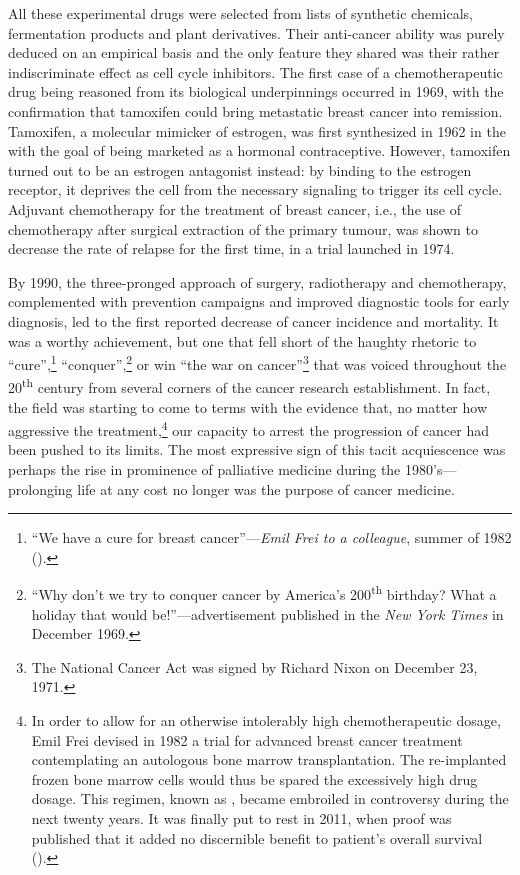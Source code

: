 All these experimental drugs were selected from lists of synthetic chemicals,
fermentation products and plant derivatives.  Their anti-cancer ability was
purely deduced on an empirical basis and the only feature they shared was their
rather indiscriminate effect as cell cycle inhibitors.  The first case of a
chemotherapeutic drug being reasoned from its biological underpinnings occurred
in 1969, with the confirmation that tamoxifen could bring metastatic breast
cancer into remission.\cite{cole_new_1971} Tamoxifen, a molecular mimicker of
estrogen, was first synthesized in 1962 in the  with the goal of
being marketed as a hormonal contraceptive.  However, tamoxifen turned out to be
an estrogen antagonist instead: by binding to the estrogen receptor, it deprives
the cell from the necessary signaling to trigger its cell
cycle.\cite{jordan_effects_1977} Adjuvant chemotherapy for the treatment of
breast cancer, i.e., the use of chemotherapy after surgical extraction of the
primary tumour, was shown to decrease the rate of relapse for the first time, in
a trial launched in 1974.\cite{bonadonna_combination_1976}

By 1990, the three-pronged approach of surgery, radiotherapy and
chemotherapy, complemented with prevention campaigns and improved
diagnostic tools for early diagnosis, led to the first reported
decrease of cancer incidence and mortality.\cite{devita_two_2012} It
was a worthy achievement, but one that fell short of the haughty
rhetoric to ``cure'',\footnote{``We have a cure for breast
  cancer''---\emph{Emil Frei to a colleague}, summer of 1982
  (\citealp{mukherjee_emperor_2011}).} ``conquer'',\footnote{``Why
  don't we try to conquer cancer by America's 200\textsuperscript{th}
  birthday? What a holiday that would be!''---advertisement published
  in the \emph{New York Times} in December 1969.} or win ``the war on
cancer''\footnote{The National Cancer Act was signed by Richard Nixon
  on December 23, 1971.} that was voiced throughout the
20\textsuperscript{th} century from several corners of the cancer
research establishment.  In fact, the field was starting to come to
terms with the evidence that, no matter how aggressive the
treatment,\footnote{In order to allow for an otherwise intolerably
  high chemotherapeutic dosage, Emil Frei devised in 1982 a trial for
  advanced breast cancer treatment contemplating an autologous bone
  marrow transplantation.  The re-implanted frozen bone marrow cells
  would thus be spared the excessively high drug dosage.  This
  regimen, known as , became embroiled in controversy
  during the next twenty years.  It was finally put to rest in 2011,
  when proof was published that it added no discernible benefit to
  patient's overall survival (\citealp{berry_high-dose_2011}).} our
capacity to arrest the progression of cancer had been pushed to its
limits.  The most expressive sign of this tacit acquiescence was
perhaps the rise in prominence of palliative medicine during the
1980's---prolonging life at any cost no longer was the purpose of
cancer medicine.

